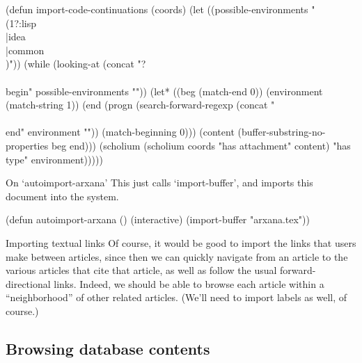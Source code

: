 \begin{elisp}
(defun import-code-continuations (coords)
  (let ((possible-environments
         "\\(1?:lisp\\|idea\\|common\\)"))
    (while (looking-at
            (concat "\n*?\\\\begin{"
                    possible-environments
                    "}"))
      (let* ((beg (match-end 0))
             (environment (match-string 1))
             (end (progn (search-forward-regexp
                          (concat "\\\\end{"
                                  environment
                                  "}"))
                         (match-beginning 0)))
             (content (buffer-substring-no-properties
                       beg
                       end)))
        (scholium (scholium coords
                            "has attachment"
                            content)
                  "has type"
                  environment)))))
\end{elisp}

\begin{notate}{On `autoimport-arxana'} \label{autoimport-arxana}
This just calls `import-buffer', and imports this document
into the system.
\end{notate}

\begin{elisp}
(defun autoimport-arxana ()
  (interactive)
  (import-buffer "arxana.tex"))
\end{elisp}

\begin{notate}{Importing textual links}
Of course, it would be good to import the links that users
make between articles, since then we can quickly navigate
from an article to the various articles that cite that
article, as well as follow the usual forward-directional
links.  Indeed, we should be able to browse each article
within a ``neighborhood'' of other related articles.
(We'll need to import labels as well, of course.)
\end{notate}

\subsection{Browsing database contents} \label{browsing}


